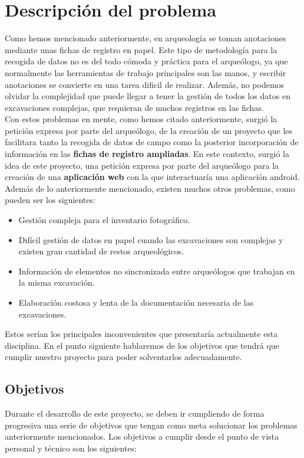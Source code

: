 \chapter{Descripción del problema}
Como hemos mencionado anteriormente, en arqueología se toman anotaciones mediante unas fichas
de registro en papel. Este tipo de metodología para la recogida de datos no es del todo cómoda
y práctica para el arqueólogo, ya que normalmente las herramientas de trabajo principales son
las manos, y escribir anotaciones se convierte en una tarea dificil de realizar. Además, no
podemos olvidar la complejidad que puede llegar a tener la gestión de todos los datos en
excavaciones complejas, que requieran de muchos registros en las fichas. \\

Con estos problemas en mente, como hemos citado anteriormente, surgió la petición expresa por
parte del arqueólogo, de la creación de un proyecto que les facilitara tanto la recogida de datos
de campo como la posterior incorporación de información en las \textbf{fichas de registro
ampliadas}. En este contexto, surgió la idea de este proyecto, una petición expresa por parte
del arqueólogo para la creación de una \textbf{aplicación web} con la que interactuaría una
aplicación android. \\

Además de lo anteriormente mencionado, existen muchos otros problemas, como pueden ser los
siguientes:

    \begin{itemize}
        \item Gestión compleja para el inventario fotográfico.
        \item Difícil gestión de datos en papel cuando las excavaciones son complejas y
        existen gran cantidad de restos arqueológicos.
        \item Información de elementos no sincronizada entre arqueólogos que trabajan en la
        misma excavación.
        \item Elaboración costosa y lenta de la documentación necesaria de las excavaciones.
    \end{itemize}

Estos serían los principales inconvenientes que presentaría actualmente esta disciplina. En
el punto siguiente hablaremos de los objetivos que tendrá que cumplir nuestro proyecto para
poder solventarlos adecuadamente.

\section{Objetivos}
Durante el desarrollo de este proyecto, se deben ir cumpliendo de forma progresiva una serie
de objetivos que tengan como meta solucionar los problemas anteriormente mencionados. Los
objetivos a cumplir desde el punto de vista personal y técnico son los siguientes:

